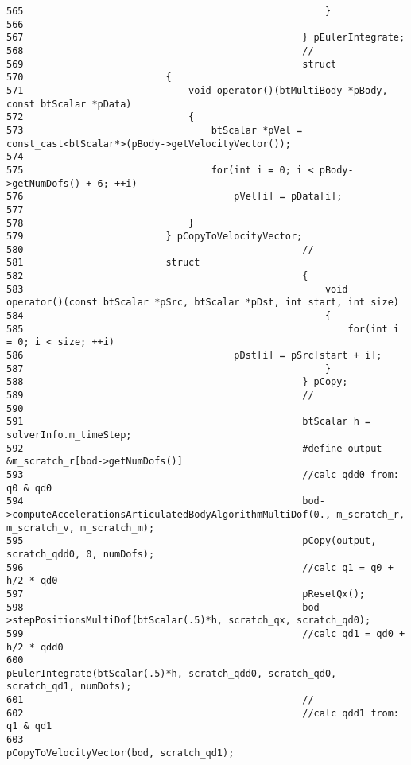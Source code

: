\begin{Code}
\begin{verbatim}
565                                                     }
566 
567                                                 } pEulerIntegrate;
568                                                 //
569                                                 struct
570                         {
571                             void operator()(btMultiBody *pBody, const btScalar *pData)
572                             {
573                                 btScalar *pVel = const_cast<btScalar*>(pBody->getVelocityVector());
574 
575                                 for(int i = 0; i < pBody->getNumDofs() + 6; ++i)
576                                     pVel[i] = pData[i];
577 
578                             }
579                         } pCopyToVelocityVector;
580                                                 //
581                         struct
582                                                 {
583                                                     void operator()(const btScalar *pSrc, btScalar *pDst, int start, int size)
584                                                     {
585                                                         for(int i = 0; i < size; ++i)
586                                     pDst[i] = pSrc[start + i];
587                                                     }
588                                                 } pCopy;
589                                                 //
590 
591                                                 btScalar h = solverInfo.m_timeStep;
592                                                 #define output &m_scratch_r[bod->getNumDofs()]
593                                                 //calc qdd0 from: q0 & qd0      
594                                                 bod->computeAccelerationsArticulatedBodyAlgorithmMultiDof(0., m_scratch_r, m_scratch_v, m_scratch_m);
595                                                 pCopy(output, scratch_qdd0, 0, numDofs);
596                                                 //calc q1 = q0 + h/2 * qd0
597                                                 pResetQx();
598                                                 bod->stepPositionsMultiDof(btScalar(.5)*h, scratch_qx, scratch_qd0);
599                                                 //calc qd1 = qd0 + h/2 * qdd0
600                                                 pEulerIntegrate(btScalar(.5)*h, scratch_qdd0, scratch_qd0, scratch_qd1, numDofs);
601                                                 //
602                                                 //calc qdd1 from: q1 & qd1
603                                                 pCopyToVelocityVector(bod, scratch_qd1);

\end{verbatim}
\end{Code}
